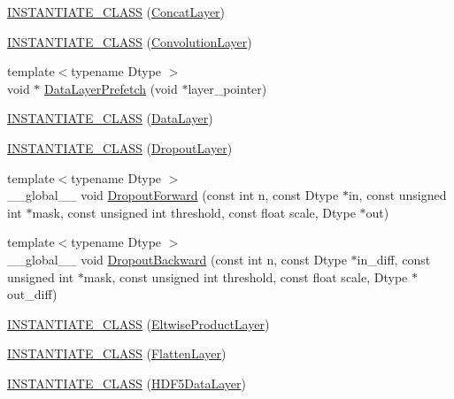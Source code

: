 \begin{DoxyCompactItemize}
\item 
\hyperlink{namespacecaffe_ae8385127f2ec655c3d3a56dc238d72c6}{I\+N\+S\+T\+A\+N\+T\+I\+A\+T\+E\+\_\+\+C\+L\+A\+S\+S} (\hyperlink{classcaffe_1_1_concat_layer}{Concat\+Layer})
\item 
\hyperlink{namespacecaffe_a0d0970b7b84f0b52deea86972f5cce4d}{I\+N\+S\+T\+A\+N\+T\+I\+A\+T\+E\+\_\+\+C\+L\+A\+S\+S} (\hyperlink{classcaffe_1_1_convolution_layer}{Convolution\+Layer})
\item 
{\footnotesize template$<$typename Dtype $>$ }\\void $\ast$ \hyperlink{namespacecaffe_aa9933a49954956739e599dff49345ef7}{Data\+Layer\+Prefetch} (void $\ast$layer\+\_\+pointer)
\item 
\hyperlink{namespacecaffe_a0e7276cce32956a506510b7879de1d0f}{I\+N\+S\+T\+A\+N\+T\+I\+A\+T\+E\+\_\+\+C\+L\+A\+S\+S} (\hyperlink{classcaffe_1_1_data_layer}{Data\+Layer})
\item 
\hyperlink{namespacecaffe_a3ddfb0dd062592a2e7b625246518184c}{I\+N\+S\+T\+A\+N\+T\+I\+A\+T\+E\+\_\+\+C\+L\+A\+S\+S} (\hyperlink{classcaffe_1_1_dropout_layer}{Dropout\+Layer})
\item 
{\footnotesize template$<$typename Dtype $>$ }\\\+\_\+\+\_\+global\+\_\+\+\_\+ void \hyperlink{namespacecaffe_acbb974c590152030733b853fdee8a384}{Dropout\+Forward} (const int n, const Dtype $\ast$in, const unsigned int $\ast$mask, const unsigned int threshold, const float scale, Dtype $\ast$out)
\item 
{\footnotesize template$<$typename Dtype $>$ }\\\+\_\+\+\_\+global\+\_\+\+\_\+ void \hyperlink{namespacecaffe_ad5a0ade82e9862148c3e957d66b19ec4}{Dropout\+Backward} (const int n, const Dtype $\ast$in\+\_\+diff, const unsigned int $\ast$mask, const unsigned int threshold, const float scale, Dtype $\ast$out\+\_\+diff)
\item 
\hyperlink{namespacecaffe_a33dd23ad16f92585675043343bf63b8c}{I\+N\+S\+T\+A\+N\+T\+I\+A\+T\+E\+\_\+\+C\+L\+A\+S\+S} (\hyperlink{classcaffe_1_1_eltwise_product_layer}{Eltwise\+Product\+Layer})
\item 
\hyperlink{namespacecaffe_a4cf041fd4eb88960848b5bbb1ddf3e5e}{I\+N\+S\+T\+A\+N\+T\+I\+A\+T\+E\+\_\+\+C\+L\+A\+S\+S} (\hyperlink{classcaffe_1_1_flatten_layer}{Flatten\+Layer})
\item 
\hyperlink{namespacecaffe_ad29048e04dcd17b90ac51b4666fbbfa7}{I\+N\+S\+T\+A\+N\+T\+I\+A\+T\+E\+\_\+\+C\+L\+A\+S\+S} (\hyperlink{classcaffe_1_1_h_d_f5_data_layer}{H\+D\+F5\+Data\+Layer})

\end{DoxyCompactItemize}
